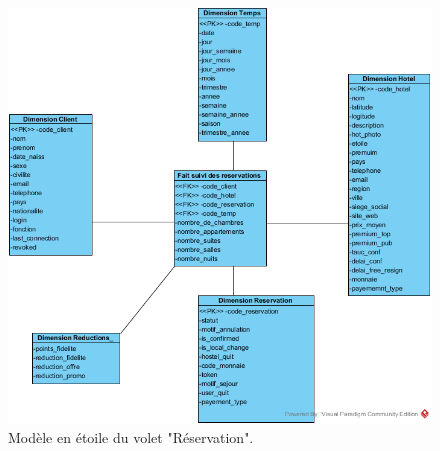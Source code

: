 \begin{figure}[!htbp]
	\begin{center}
		\includegraphics[scale=0.65]{images/star_reservations.png}
		\caption{Modèle en étoile du volet "Réservation".}
		\label{use_bi_tools}
	\end{center}
	\end{figure}


